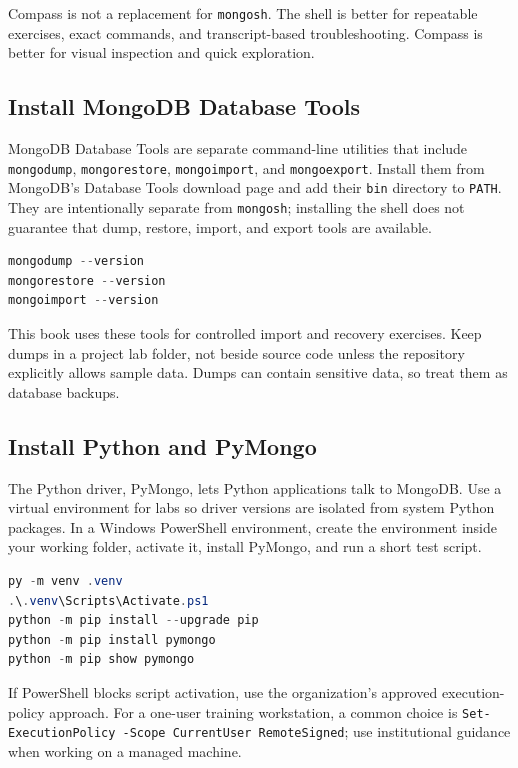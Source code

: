 Compass is not a replacement for \texttt{mongosh}. The shell is better for repeatable exercises, exact commands, and transcript-based troubleshooting. Compass is better for visual inspection and quick exploration.

\subsection{Install MongoDB Database Tools}
MongoDB Database Tools are separate command-line utilities that include \texttt{mongodump}, \texttt{mongorestore}, \texttt{mongoimport}, and \texttt{mongoexport}. Install them from MongoDB's Database Tools download page and add their \texttt{bin} directory to \texttt{PATH}. They are intentionally separate from \texttt{mongosh}; installing the shell does not guarantee that dump, restore, import, and export tools are available.

\begin{lstlisting}[language=PowerShell, caption={Verifying MongoDB Database Tools.}]
mongodump --version
mongorestore --version
mongoimport --version
\end{lstlisting}

This book uses these tools for controlled import and recovery exercises. Keep dumps in a project lab folder, not beside source code unless the repository explicitly allows sample data. Dumps can contain sensitive data, so treat them as database backups.

\subsection{Install Python and PyMongo}
The Python driver, PyMongo, lets Python applications talk to MongoDB. Use a virtual environment for labs so driver versions are isolated from system Python packages. In a Windows PowerShell environment, create the environment inside your working folder, activate it, install PyMongo, and run a short test script.

\begin{lstlisting}[language=PowerShell, caption={Creating a Python virtual environment and installing PyMongo.}]
py -m venv .venv
.\.venv\Scripts\Activate.ps1
python -m pip install --upgrade pip
python -m pip install pymongo
python -m pip show pymongo
\end{lstlisting}

If PowerShell blocks script activation, use the organization's approved execution-policy approach. For a one-user training workstation, a common choice is \texttt{Set-ExecutionPolicy -Scope CurrentUser RemoteSigned}; use institutional guidance when working on a managed machine.

